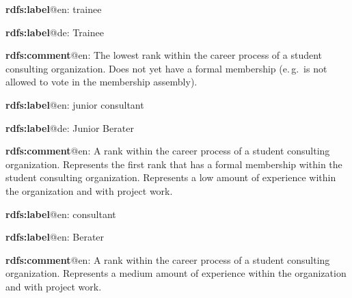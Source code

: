 \documentclass[a4paper, DIV=13, BCOR=0cm]{scrbook}
\newcommand{\eg}{e.\,g.\ }
\begin{document}
\begin{mdframed}[style=onto-3, frametitle={Trainee}]
	{%
		\begin{compactitem}
			\item \textbf{rdfs:label}@en: trainee
			\item \textbf{rdfs:label}@de: Trainee
			\item \textbf{rdfs:comment}@en: The lowest rank within the career process of a student consulting organization. Does not yet have a formal membership (\eg is not allowed to vote in the membership assembly).
		\end{compactitem}
	} %
\end{mdframed}

\begin{mdframed}[style=onto-3, frametitle={Junior\_Consultant}]
	{%
		\begin{compactitem}
			\item \textbf{rdfs:label}@en: junior consultant
			\item \textbf{rdfs:label}@de: Junior Berater
			\item \textbf{rdfs:comment}@en: A rank within the career process of a student consulting organization. Represents the first rank that has a formal membership within the student consulting organization. Represents a low amount of experience within the organization and with project work.
		\end{compactitem}
	} %
\end{mdframed}

\begin{mdframed}[style=onto-3, frametitle={Consultant}]
	{%
		\begin{compactitem}
			\item \textbf{rdfs:label}@en: consultant
			\item \textbf{rdfs:label}@en: Berater
			\item \textbf{rdfs:comment}@en: A rank within the career process of a student consulting organization. Represents a medium amount of experience within the organization and with project work.
		\end{compactitem}
	} %
\end{mdframed}
\end{document}
